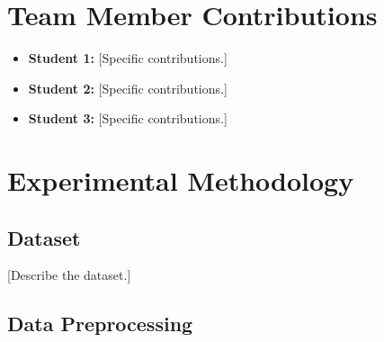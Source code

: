 \documentclass[conference]{IEEEtran}
\begin{document}

\section{Team Member Contributions}

%
%
%

\begin{itemize}

    \item \textbf{Student 1:}
    [Specific contributions.]

    \item \textbf{Student 2:}
    [Specific contributions.]

    \item \textbf{Student 3:}
    [Specific contributions.]

\end{itemize}


\newpage

\color{red}
\section{Experimental Methodology}


\subsection{Dataset}

%
%

[Describe the dataset.]


\subsection{Data Preprocessing}
\end{document}
